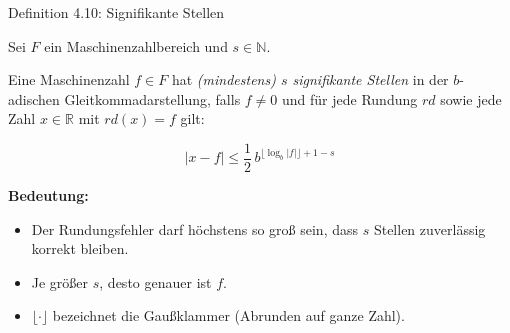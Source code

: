 \documentclass{beamer}
\begin{document}
\begin{frame}{Definition 4.10: Signifikante Stellen}

\scriptsize

Sei \(F\) ein Maschinenzahlbereich und \(s\in\mathbb{N}\).

Eine Maschinenzahl \(f\in F\) hat \emph{(mindestens) \(s\) signifikante Stellen}
in der \(b\)-adischen Gleitkommadarstellung, falls \(f\neq 0\) und für jede
Rundung \(rd\) sowie jede Zahl \(x\in\mathbb{R}\) mit \(rd(x)=f\) gilt:

\[
|x-f|
\le
\frac{1}{2}\, b^{\lfloor \log_b |f| \rfloor +1-s}
\]

\vspace{0.4cm}

\textbf{Bedeutung:}

\begin{itemize}
\item Der Rundungsfehler darf höchstens so groß sein,
      dass \(s\) Stellen zuverlässig korrekt bleiben.
\item Je größer \(s\), desto genauer ist \(f\).
\item \(\lfloor\cdot\rfloor\) bezeichnet die Gaußklammer
      (Abrunden auf ganze Zahl).
\end{itemize}

\end{frame}
\end{document}
